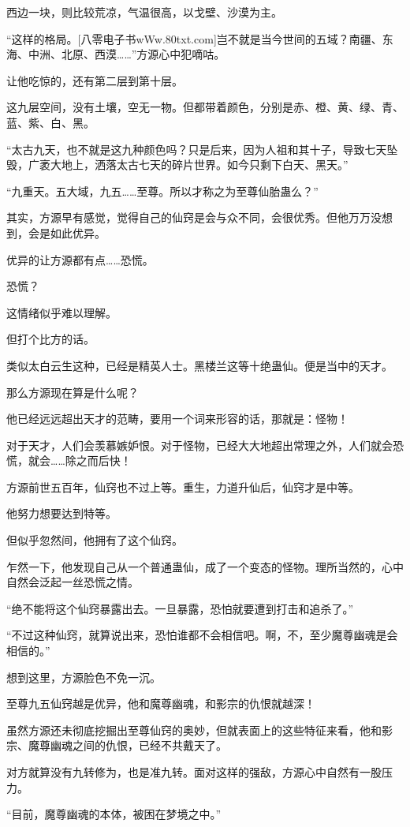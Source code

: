 \begin{this_body}
西边一块，则比较荒凉，气温很高，以戈壁、沙漠为主。

“这样的格局。[八零电子书wWw.80txt.com]岂不就是当今世间的五域？南疆、东海、中洲、北原、西漠……”方源心中犯嘀咕。

让他吃惊的，还有第二层到第十层。

这九层空间，没有土壤，空无一物。但都带着颜色，分别是赤、橙、黄、绿、青、蓝、紫、白、黑。

“太古九天，也不就是这九种颜色吗？只是后来，因为人祖和其十子，导致七天坠毁，广袤大地上，洒落太古七天的碎片世界。如今只剩下白天、黑天。”

“九重天。五大域，九五……至尊。所以才称之为至尊仙胎蛊么？”

其实，方源早有感觉，觉得自己的仙窍是会与众不同，会很优秀。但他万万没想到，会是如此优异。

优异的让方源都有点……恐慌。

恐慌？

这情绪似乎难以理解。

但打个比方的话。

类似太白云生这种，已经是精英人士。黑楼兰这等十绝蛊仙。便是当中的天才。

那么方源现在算是什么呢？

他已经远远超出天才的范畴，要用一个词来形容的话，那就是：怪物！

对于天才，人们会羡慕嫉妒恨。对于怪物，已经大大地超出常理之外，人们就会恐慌，就会……除之而后快！

方源前世五百年，仙窍也不过上等。重生，力道升仙后，仙窍才是中等。

他努力想要达到特等。

但似乎忽然间，他拥有了这个仙窍。

乍然一下，他发现自己从一个普通蛊仙，成了一个变态的怪物。理所当然的，心中自然会泛起一丝恐慌之情。

“绝不能将这个仙窍暴露出去。一旦暴露，恐怕就要遭到打击和追杀了。”

“不过这种仙窍，就算说出来，恐怕谁都不会相信吧。啊，不，至少魔尊幽魂是会相信的。”

想到这里，方源脸色不免一沉。

至尊九五仙窍越是优异，他和魔尊幽魂，和影宗的仇恨就越深！

虽然方源还未彻底挖掘出至尊仙窍的奥妙，但就表面上的这些特征来看，他和影宗、魔尊幽魂之间的仇恨，已经不共戴天了。

对方就算没有九转修为，也是准九转。面对这样的强敌，方源心中自然有一股压力。

“目前，魔尊幽魂的本体，被困在梦境之中。”


\end{this_body}
